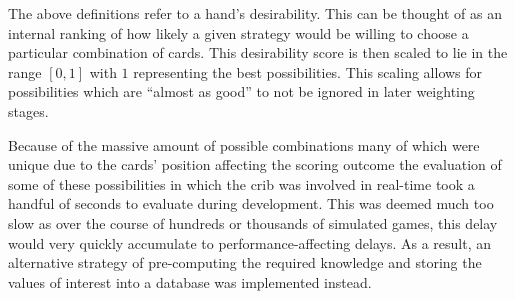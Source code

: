 %
The above definitions refer to a hand's desirability.
%
This can be thought of as an internal ranking of how likely a given strategy
would be willing to choose a particular combination of cards.
%
This desirability score is then scaled to lie in the range $[0, 1]$ with
$1$ representing the best possibilities.
%
This scaling allows for possibilities which are ``almost as good'' to not be
ignored in later weighting stages.




Because of the massive amount of possible combinations%
\textemdash many of which were unique due to the cards' position affecting the
scoring outcome\textemdash%
the evaluation of some of these possibilities in which the crib was involved
in real-time took a handful of seconds to evaluate during development.
%
This was deemed much too slow as over the course of hundreds or thousands of
simulated games,
this delay would very quickly accumulate to performance-affecting delays.
%
As a result, an alternative strategy of pre-computing the required knowledge and
storing the values of interest into a database was implemented instead.

